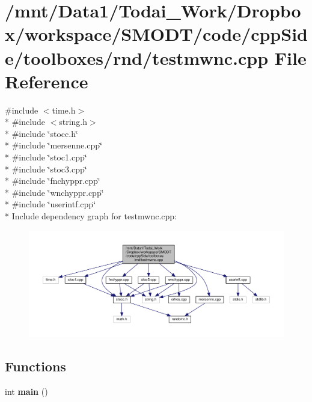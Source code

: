 \section{/mnt/\-Data1/\-Todai\-\_\-\-Work/\-Dropbox/workspace/\-S\-M\-O\-D\-T/code/cpp\-Side/toolboxes/rnd/testmwnc.cpp File Reference}
\label{toolboxes_2rnd_2testmwnc_8cpp}
{\ttfamily \#include $<$time.\-h$>$}\\*
{\ttfamily \#include $<$string.\-h$>$}\\*
{\ttfamily \#include \char`\"{}stocc.\-h\char`\"{}}\\*
{\ttfamily \#include \char`\"{}mersenne.\-cpp\char`\"{}}\\*
{\ttfamily \#include \char`\"{}stoc1.\-cpp\char`\"{}}\\*
{\ttfamily \#include \char`\"{}stoc3.\-cpp\char`\"{}}\\*
{\ttfamily \#include \char`\"{}fnchyppr.\-cpp\char`\"{}}\\*
{\ttfamily \#include \char`\"{}wnchyppr.\-cpp\char`\"{}}\\*
{\ttfamily \#include \char`\"{}userintf.\-cpp\char`\"{}}\\*
Include dependency graph for testmwnc.\-cpp\-:\nopagebreak
\begin{figure}[H]
\begin{center}
\leavevmode
\includegraphics[width=350pt]{toolboxes_2rnd_2testmwnc_8cpp__incl}
\end{center}
\end{figure}
\subsection*{Functions}
\begin{DoxyCompactItemize}
\item 
int {\bf main} ()
\end{DoxyCompactItemize}
